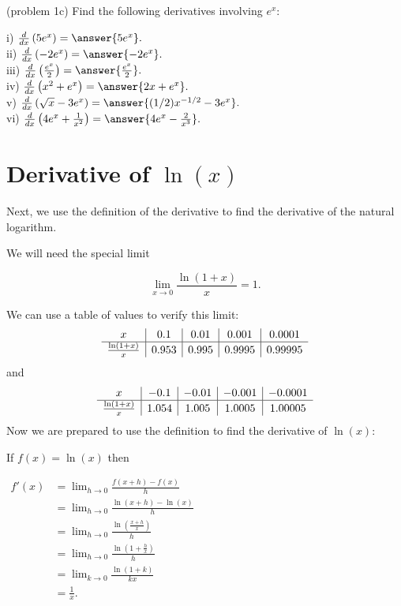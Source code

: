 \documentclass{ximera}
\begin{document}
\begin{problem}(problem 1c)
Find the following derivatives involving $e^x$:

i) $\frac{d}{dx} \left(5e^x\right) = \answer{5e^x}.$\\
ii) $\frac{d}{dx} \left(-2e^x\right) = \answer{-2e^x}.$\\
iii) $\frac{d}{dx} \left(\frac{e^x}{2}\right) = \answer{\frac{e^x}{2}}.$\\
iv) $\frac{d}{dx} \left(x^2 + e^x\right) = \answer{2x + e^x}.$\\
v) $\frac{d}{dx} \left(\sqrt x - 3e^x\right) = \answer{(1/2)x^{-1/2} - 3e^x}.$\\
vi) $\frac{d}{dx} \left(4e^x + \frac{1}{x^2}\right) = \answer{4e^x -\frac{2}{x^3}}.$


\end{problem}



\section{Derivative of $\ln(x)$}


Next, we use the definition of the derivative to find the derivative of the natural logarithm.



We will need the special limit 

\[
\lim_{x \to 0} \frac{\ln(1 + x)}{x} = 1.
\]

We can use a table of values to verify this limit:
\[
\begin{array}{ c | c | c | c | c }
  x & 0.1 & 0.01  & 0.001 & 0.0001 \\ 
	\hline
	 \frac{\ln(1+x)}{x} & 0.953 & 0.995 & 0.9995 & 0.99995
\end{array}
\]
and
\[
\begin{array}{ c | c | c | c | c }
  x & -0.1 & -0.01  & -0.001 & -0.0001 \\ 
	\hline
	 \frac{\ln(1+x)}{x} & 1.054 & 1.005 & 1.0005 & 1.00005
\end{array}
\]
Now we are prepared to use the definition to find the derivative of $\ln(x)$:

If $f(x) = \ln(x)$ then\\[10pt]
\begin{center}
$\begin{aligned}
f'(x) &= \lim_{h \to 0} \frac{f(x+h)-f(x)}{h}\\[5pt]
&= \lim_{h \to 0}\frac{\ln(x+h)-\ln(x)}{h}\\[5pt]
&= \lim_{h \to 0} \frac{\ln(\frac{x+h}{x})}{h}\\[5pt]
&= \lim_{h \to 0}\frac{\ln(1 + \frac{h}{x})}{h}\\[5pt]
&= \lim_{k \to 0} \frac{\ln(1 + k)}{kx} \\[5pt]
&= \frac{1}{x}.
\end{aligned}$
\end{center}
\end{document}
